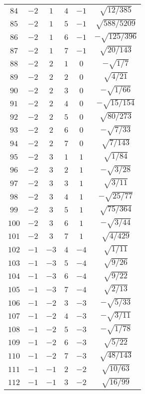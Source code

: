 \begin{table}
\begin{center}
\begin{tabular}{|c|c|c|c|c|c|}
$84$ & $-2$ & $1$ & $4$ & $-1$ & $\sqrt{12/385}$ \\ 
$85$ & $-2$ & $1$ & $5$ & $-1$ & $\sqrt{588/5209}$ \\ 
$86$ & $-2$ & $1$ & $6$ & $-1$ & $-\sqrt{125/396}$ \\ 
$87$ & $-2$ & $1$ & $7$ & $-1$ & $\sqrt{20/143}$ \\ 
$88$ & $-2$ & $2$ & $1$ & $0$ & $-\sqrt{1/7}$ \\ 
$89$ & $-2$ & $2$ & $2$ & $0$ & $\sqrt{4/21}$ \\ 
$90$ & $-2$ & $2$ & $3$ & $0$ & $-\sqrt{1/66}$ \\ 
$91$ & $-2$ & $2$ & $4$ & $0$ & $-\sqrt{15/154}$ \\ 
$92$ & $-2$ & $2$ & $5$ & $0$ & $\sqrt{80/273}$ \\ 
$93$ & $-2$ & $2$ & $6$ & $0$ & $-\sqrt{7/33}$ \\ 
$94$ & $-2$ & $2$ & $7$ & $0$ & $\sqrt{7/143}$ \\ 
$95$ & $-2$ & $3$ & $1$ & $1$ & $\sqrt{1/84}$ \\ 
$96$ & $-2$ & $3$ & $2$ & $1$ & $-\sqrt{3/28}$ \\ 
$97$ & $-2$ & $3$ & $3$ & $1$ & $\sqrt{3/11}$ \\ 
$98$ & $-2$ & $3$ & $4$ & $1$ & $-\sqrt{25/77}$ \\ 
$99$ & $-2$ & $3$ & $5$ & $1$ & $\sqrt{75/364}$ \\ 
$100$ & $-2$ & $3$ & $6$ & $1$ & $-\sqrt{3/44}$ \\ 
$101$ & $-2$ & $3$ & $7$ & $1$ & $\sqrt{4/429}$ \\ 
$102$ & $-1$ & $-3$ & $4$ & $-4$ & $\sqrt{1/11}$ \\ 
$103$ & $-1$ & $-3$ & $5$ & $-4$ & $\sqrt{9/26}$ \\ 
$104$ & $-1$ & $-3$ & $6$ & $-4$ & $\sqrt{9/22}$ \\ 
$105$ & $-1$ & $-3$ & $7$ & $-4$ & $\sqrt{2/13}$ \\ 
$106$ & $-1$ & $-2$ & $3$ & $-3$ & $-\sqrt{5/33}$ \\ 
$107$ & $-1$ & $-2$ & $4$ & $-3$ & $-\sqrt{3/11}$ \\ 
$108$ & $-1$ & $-2$ & $5$ & $-3$ & $-\sqrt{1/78}$ \\ 
$109$ & $-1$ & $-2$ & $6$ & $-3$ & $\sqrt{5/22}$ \\ 
$110$ & $-1$ & $-2$ & $7$ & $-3$ & $\sqrt{48/143}$ \\ 
$111$ & $-1$ & $-1$ & $2$ & $-2$ & $\sqrt{10/63}$ \\ 
$112$ & $-1$ & $-1$ & $3$ & $-2$ & $\sqrt{16/99}$ \\ 

\end{tabular}
\end{center}
\end{table}
